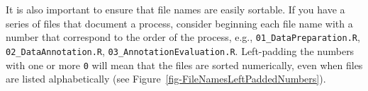 \documentclass[
  letterpaper,
  DIV=11,
  numbers=noendperiod]{scrreprt}
\begin{document}
It is also important to ensure that file names are easily sortable. If
you have a series of files that document a process, consider beginning
each file name with a number that correspond to the order of the
process, e.g., \texttt{01\_DataPreparation.R},
\texttt{02\_DataAnnotation.R}, \texttt{03\_AnnotationEvaluation.R}.
Left-padding the numbers with one or more \texttt{0} will mean that the
files are sorted numerically, even when files are listed alphabetically
(see Figure~\ref{fig-FileNamesLeftPaddedNumbers}).

\begin{figure}

\begin{minipage}{0.50\linewidth}



\end{minipage}%
%
\begin{minipage}{0.50\linewidth}

\end{minipage}
\end{figure}
\end{document}
